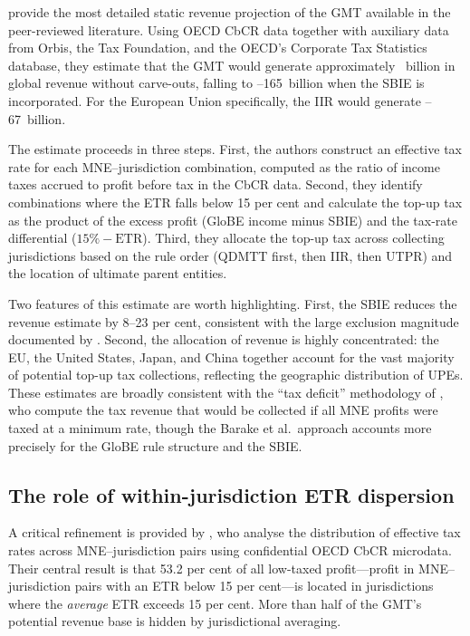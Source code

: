 \documentclass[12pt,a4paper]{article}
\begin{document}
\textcite{barake2022} provide the most detailed static revenue projection of the GMT available in the peer-reviewed literature.
Using OECD CbCR data together with auxiliary data from Orbis, the Tax Foundation, and the OECD's Corporate Tax Statistics database, they estimate that the GMT would generate approximately ~billion in global revenue without carve-outs, falling to --165~billion when the SBIE is incorporated.
For the European Union specifically, the IIR would generate --67~billion.

The estimate proceeds in three steps.
First, the authors construct an effective tax rate for each MNE--jurisdiction combination, computed as the ratio of income taxes accrued to profit before tax in the CbCR data.
Second, they identify combinations where the ETR falls below 15 per cent and calculate the top-up tax as the product of the excess profit (GloBE income minus SBIE) and the tax-rate differential ($15\% - \text{ETR}$).
Third, they allocate the top-up tax across collecting jurisdictions based on the rule order (QDMTT first, then IIR, then UTPR) and the location of ultimate parent entities.

Two features of this estimate are worth highlighting.
First, the SBIE reduces the revenue estimate by 8--23 per cent, consistent with the large exclusion magnitude documented by \textcite{devereux2023}.
Second, the allocation of revenue is highly concentrated: the EU, the United States, Japan, and China together account for the vast majority of potential top-up tax collections, reflecting the geographic distribution of UPEs.
These estimates are broadly consistent with the ``tax deficit'' methodology of \textcite{clausing2021}, who compute the tax revenue that would be collected if all MNE profits were taxed at a minimum rate, though the Barake et al.\ approach accounts more precisely for the GloBE rule structure and the SBIE.

\subsection{The role of within-jurisdiction ETR dispersion}

A critical refinement is provided by \textcite{hugger2025}, who analyse the distribution of effective tax rates across MNE--jurisdiction pairs using confidential OECD CbCR microdata.
Their central result is that 53.2 per cent of all low-taxed profit---profit in MNE--jurisdiction pairs with an ETR below 15 per cent---is located in jurisdictions where the \emph{average} ETR exceeds 15 per cent.
More than half of the GMT's potential revenue base is hidden by jurisdictional averaging.
\end{document}
